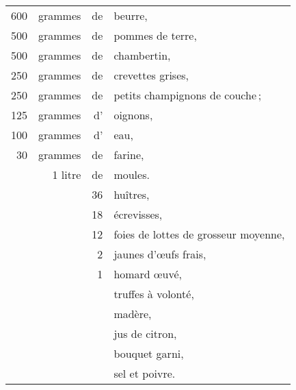 \footnotesize
\begin{longtable}{rrrp{16em}}
    600 & grammes & de & beurre,                                                                          \\
    500 & grammes & de & pommes de terre,                                                                 \\
    500 & grammes & de & chambertin,                                                                      \\
    250 & grammes & de & crevettes grises,                                                                \\
    250 & grammes & de & petits champignons de couche ;                                                   \\
    125 & grammes & d' & oignons,                                                                         \\
    100 & grammes & d' & eau,                                                                             \\
     30 & grammes & de & farine,                                                                          \\
        & 1 litre & de & moules.                                                                          \\
        &         & 36 & huîtres,                                                                         \\
        &         & 18 & écrevisses,                                                                      \\
        &         & 12 & foies de lottes de grosseur moyenne,                                             \\
        &         &  2 & jaunes d'œufs frais,                                                             \\
        &         &  1 & homard œuvé,                                                                     \\
        &         &    & truffes à volonté,                                                               \\
        &         &    & madère,                                                                          \\
        &         &    & jus de citron,                                                                   \\
        &         &    & bouquet garni,                                                                   \\
        &         &    & sel et poivre.                                                                   \\
\end{longtable}
\normalsize

